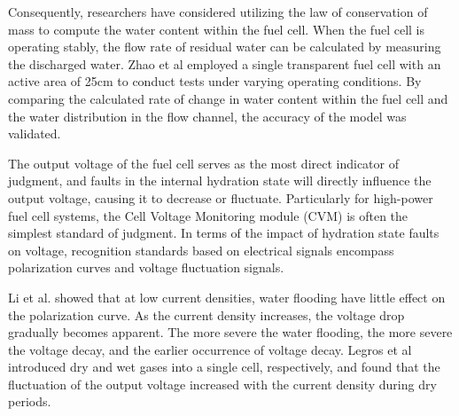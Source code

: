 \par
Consequently, researchers have considered utilizing the law of conservation of mass to compute the water content within the fuel cell. When the fuel cell is operating stably, the flow rate of residual water can be calculated by measuring the discharged water. Zhao et al\cite{zhaoStudyWaterTransport2021} employed a single transparent fuel cell with an active area of 25cm to conduct tests under varying operating conditions.
By comparing the calculated rate of change in water content within the fuel cell and the water distribution in the flow channel, the accuracy of the model was validated.
\par
The output voltage of the fuel cell serves as the most direct indicator of judgment, and faults in the internal hydration state will directly influence the output voltage, causing it to decrease or fluctuate. Particularly for high-power fuel cell systems, the Cell Voltage Monitoring module (CVM) is often the simplest standard of judgment. In terms of the impact of hydration state faults on voltage, recognition standards based on electrical signals encompass polarization curves and voltage fluctuation signals.
\par
Li et al.\cite{liReviewWaterFlooding2008} showed that at low current densities, water flooding have little effect on the polarization curve. As the current density increases, the voltage drop gradually becomes apparent. The more severe the water flooding, the more severe the voltage decay, and the earlier occurrence of voltage decay. Legros et al\cite{legrosFirstResultsPEMFC2011} introduced dry and wet gases into a single cell, respectively, and found that the fluctuation of the output voltage increased with the current density during dry periods.
